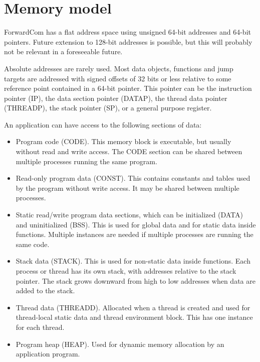 \documentclass[forwardcom.tex]{subfiles}
\begin{document}
\RaggedRight

\chapter{Memory model} \label{memoryModel}
ForwardCom has a flat address space using unsigned 64-bit addresses and 64-bit pointers. Future extension to 128-bit addresses is possible, but this will probably not be relevant in a foreseeable future. 
\vv

Absolute addresses are rarely used. Most data objects, functions and jump targets are addressed with signed offsets of 32 bits or less relative to some reference point contained in a 64-bit pointer. This pointer can be the instruction pointer (IP), the data section pointer (DATAP), the thread data
pointer (THREADP), the stack pointer (SP), or a general purpose register.
\vv

An application can have access to the following sections of data:
\vv

\begin{itemize}
\item Program code (CODE). This memory block is executable, but usually without read and write access. The CODE section can be shared between multiple processes running the same program. 

\item Read-only program data (CONST). This contains constants and tables used by the program without write access. It may be shared between multiple processes. 

\item Static read/write program data sections, which can be initialized (DATA) and uninitialized (BSS). This is used for global data and for static data inside functions. Multiple instances are needed if multiple processes are running the same code. 

\item Stack data (STACK). This is used for non-static data inside functions. Each process or thread has its own stack, with addresses relative to the stack pointer. The stack grows downward from high to low addresses when data are added to the stack. 

\item Thread data (THREADD). Allocated when a thread is created and used for thread-local static data and thread environment block. This has one instance for each thread.

\item Program heap (HEAP). Used for dynamic memory allocation by an application program. 
\end{itemize}
\end{document}
